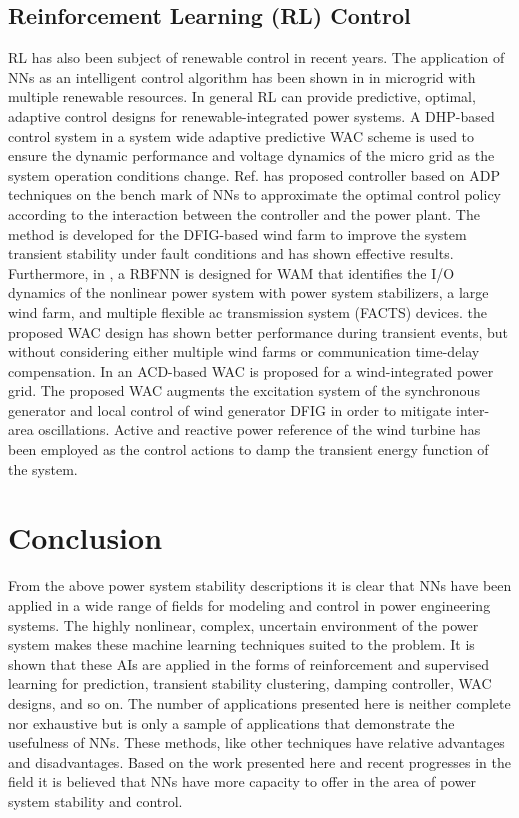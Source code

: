 \documentclass[journal]{IEEEtran}
\begin{document}
\subsection{Reinforcement Learning (RL) Control}
RL has also been subject of renewable control in recent years. The application of NNs as an intelligent control algorithm has been shown in \cite{7175036} in microgrid with multiple renewable resources. In general RL can provide predictive, optimal, adaptive control designs for renewable-integrated power systems. A DHP-based control system in a system wide adaptive predictive WAC scheme is used to ensure the dynamic performance and voltage dynamics of the micro grid as the system operation conditions change. Ref. \cite{6915705} has proposed controller based on ADP techniques on the bench mark of NNs to approximate the optimal control policy according to the interaction between the controller and the power plant. The method is developed for the DFIG-based wind farm to improve the system transient stability under fault conditions and has shown effective results. Furthermore, in \cite{4371281}, a RBFNN is designed for WAM that identifies the I/O dynamics of the nonlinear power system with power system stabilizers, a large wind farm, and multiple flexible ac transmission system (FACTS) devices. the proposed WAC design has shown better performance during transient events, but without considering either multiple wind farms or communication time-delay compensation. In \cite{MWIND} an ACD-based WAC is proposed for a wind-integrated power grid. The proposed WAC augments the excitation system of the synchronous generator and local control of wind generator DFIG in order to mitigate inter-area oscillations. Active and reactive power reference of the wind turbine has been employed as the control actions to damp the transient energy function of the system.

\vspace{-2mm}
\section{Conclusion}
From the above power system stability descriptions it is clear that NNs have been applied in a wide range of fields for modeling and control in power engineering systems. The highly nonlinear, complex, uncertain environment of the power system makes these machine learning techniques suited to the problem. It is shown that these AIs are applied in the forms of reinforcement and supervised learning for prediction, transient stability clustering, damping controller, WAC designs, and so on. The number of applications presented here is neither complete nor exhaustive but is only a sample of applications that demonstrate the usefulness of NNs. These methods, like other techniques have relative advantages and disadvantages. Based on the work presented here and recent progresses in the field it is believed that NNs have more capacity to offer in the area of power system stability and control.

\vspace{-2mm}


 

\end{document}
